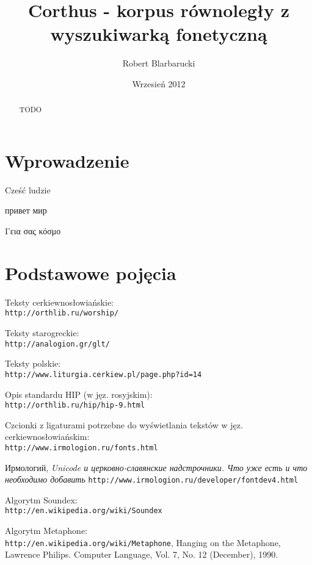 \documentclass{pracamgr}
\author{Robert Blarbarucki}
\title{Corthus - korpus równoległy z wyszukiwarką fonetyczną}
\date{Wrzesień 2012}
\begin{document}
\maketitle

\begin{abstract}
  TODO
\end{abstract}

\tableofcontents

\chapter*{Wprowadzenie}

Cześć ludzie

привет мир

Γεια σας κόσμο


\chapter{Podstawowe pojęcia}\label{r:pojecia}


\begin{thebibliography}{99}

 Teksty cerkiewnosłowiańskie:\\
  {\tt http://orthlib.ru/worship/}

 Teksty starogreckie:\\
  {\tt http://analogion.gr/glt/}

 Teksty polskie:\\
  {\tt http://www.liturgia.cerkiew.pl/page.php?id=14}

 Opis standardu HIP (w jęz. rosyjskim):\\
  {\tt http://orthlib.ru/hip/hip-9.html}

 Czcionki z ligaturami potrzebne do wyświetlania
  tekstów w jęz. cerkiewnosłowiańskim:\\
  {\tt http://www.irmologion.ru/fonts.html}

 Ирмологий, \textit{Unicode и церковно-славянские
  надстрочники. Что уже есть и что необходимо добавить}
  {\tt http://www.irmologion.ru/developer/fontdev4.html}

 Algorytm Soundex:\\
  {\tt http://en.wikipedia.org/wiki/Soundex}

 Algorytm Metaphone:\\
  {\tt http://en.wikipedia.org/wiki/Metaphone},
  Hanging on the Metaphone, Lawrence Philips. Computer Language, Vol. 7, No. 12 (December), 1990.

\end{thebibliography}
\end{document}
